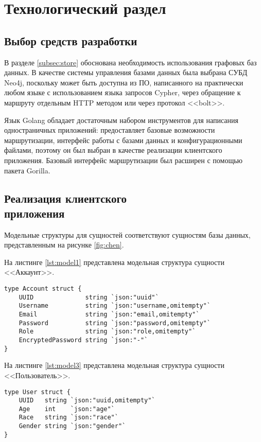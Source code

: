\chapter{Технологический раздел}\label{sec:impl}
\section{Выбор средств разработки}
В разделе \ref{subsec:store} обоснована необходимость использования графовых баз данных. В качестве системы управления базами данных была выбрана СУБД Neo4j\cite{neo4docs}, поскольку может быть доступна из ПО, написанного на практически любом языке с использованием языка запросов Cypher, через обращение к маршруту отдельным HTTP методом или через протокол <<bolt>>.

Язык Golang\cite{go} обладает достаточным набором инструментов для написания одностраничных приложений: предоставляет базовые возможности маршрутизации, интерфейс работы с базами данных и конфигурационными файлами, поэтому он был выбран в качестве реализации клиентского приложения. Базовый интерфейс маршрутизации был расширен с помощью пакета Gorilla\cite{gorilla}.

\section[Реализация клиентского приложения]{Реализация клиентского\\ приложения}
Модельные структуры для сущностей соответствуют сущностям базы данных, представленным на рисунке \ref{fig:chen}.

На листинге \ref{lst:model1} представлена модельная структура сущности <<Аккаунт>>.
\begin{lstlisting}[label=lst:model1,caption=Модельная структура сущности <<Аккаунт>>]
type Account struct {
	UUID              string `json:"uuid"`
	Username          string `json:"username,omitempty"`
	Email             string `json:"email,omitempty"`
	Password          string `json:"password,omitempty"`
	Role              string `json:"role,omitempty"`
	EncryptedPassword string `json:"-"`
}
\end{lstlisting}
На листинге \ref{lst:model3} представлена модельная структура сущности <<Пользователь>>.
\begin{lstlisting}[label=lst:model3,caption=Модельная структура сущности <<Пользователь>>]
type User struct {
	UUID   string `json:"uuid,omitempty"`
	Age    int    `json:"age"`
	Race   string `json:"race"`
	Gender string `json:"gender"`
}
\end{lstlisting}

